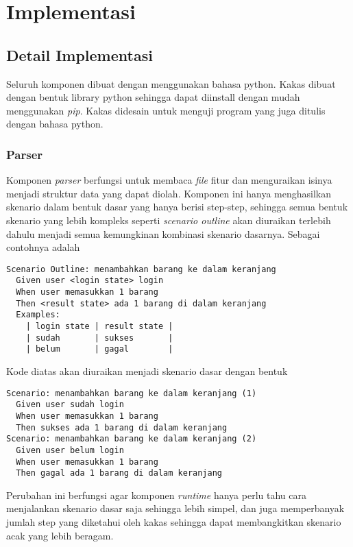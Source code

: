 \chapter{Implementasi}

\section{Detail Implementasi}

Seluruh komponen dibuat dengan menggunakan bahasa python. Kakas dibuat dengan bentuk library python
sehingga dapat diinstall dengan mudah menggunakan \emph{pip}. Kakas didesain untuk menguji
program yang juga ditulis dengan bahasa python.

\subsection{Parser}

Komponen \emph{parser} berfungsi untuk membaca \emph{file} fitur dan menguraikan isinya menjadi
struktur data yang dapat diolah. Komponen ini hanya menghasilkan skenario dalam bentuk dasar
yang hanya berisi step-step, sehingga semua bentuk skenario yang lebih kompleks
seperti \emph{scenario outline} akan diuraikan terlebih dahulu menjadi semua kemungkinan
kombinasi skenario dasarnya. Sebagai contohnya adalah

\begin{lstlisting}[language=gherkin]
Scenario Outline: menambahkan barang ke dalam keranjang
  Given user <login state> login
  When user memasukkan 1 barang
  Then <result state> ada 1 barang di dalam keranjang
  Examples:
    | login state | result state |
    | sudah       | sukses       |
    | belum       | gagal        |
\end{lstlisting}

Kode diatas akan diuraikan menjadi skenario dasar dengan bentuk

\begin{lstlisting}[language=gherkin]
Scenario: menambahkan barang ke dalam keranjang (1)
  Given user sudah login
  When user memasukkan 1 barang
  Then sukses ada 1 barang di dalam keranjang
Scenario: menambahkan barang ke dalam keranjang (2)
  Given user belum login
  When user memasukkan 1 barang
  Then gagal ada 1 barang di dalam keranjang
\end{lstlisting}

Perubahan ini berfungsi agar komponen \emph{runtime} hanya perlu tahu cara menjalankan
skenario dasar saja sehingga lebih simpel, dan juga memperbanyak jumlah step yang diketahui
oleh kakas sehingga dapat membangkitkan skenario acak yang lebih beragam.

